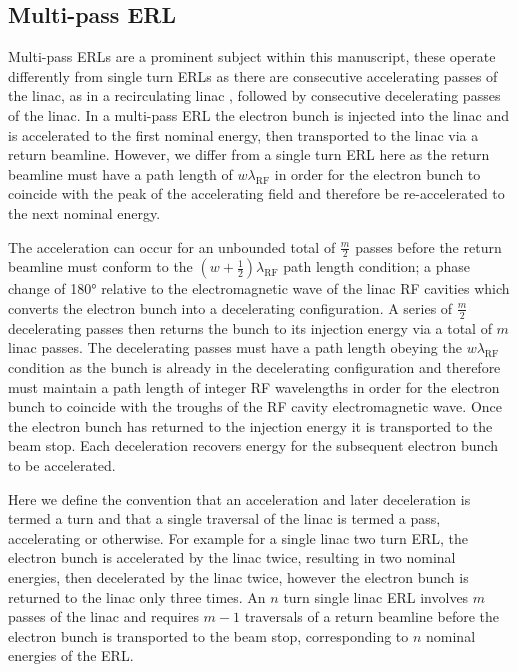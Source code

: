 \documentclass[../main.tex]{subfiles}
\begin{document}
\subsection{Multi-pass ERL}

Multi-pass ERLs are a prominent subject within this manuscript, these operate differently from single turn ERLs as there are consecutive accelerating passes of the linac, as in a recirculating linac \cite{axel1977status}, followed by consecutive decelerating passes of the linac. In a multi-pass ERL the electron bunch is injected into the linac and is accelerated to the first nominal energy, then transported to the linac via a return beamline. However, we differ from a single turn ERL here as the return beamline must have a path length of $w\lambda_{\mathrm{RF}}$ in order for the electron bunch to coincide with the peak of the accelerating field and therefore be re-accelerated to the next nominal energy.

The acceleration can occur for an unbounded total of $\frac{m}{2}$ passes before the return beamline must conform to the $\left(w+\frac{1}{2}\right)\lambda_{\mathrm{RF}}$ path length condition; a phase change of 180\si{\degree} relative to the electromagnetic wave of the linac RF cavities which converts the electron bunch into a decelerating configuration. A series of $\frac{m}{2}$ decelerating passes then returns the bunch to its injection energy via a total of $m$ linac passes. The decelerating passes must have a path length obeying the $w\lambda_{\mathrm{RF}}$ condition as the bunch is already in the decelerating configuration and therefore must maintain a path length of integer RF wavelengths in order for the electron bunch to coincide with the troughs of the RF cavity electromagnetic wave. Once the electron bunch has returned to the injection energy it is transported to the beam stop. Each deceleration recovers energy for the subsequent electron bunch to be accelerated.        

Here we define the convention that an acceleration and later deceleration is termed a turn and that a single traversal of the linac is termed a pass, accelerating or otherwise. For example for a single linac two turn ERL, the electron bunch is accelerated by the linac twice, resulting in two nominal energies, then decelerated by the linac twice, however the electron bunch is returned to the linac only three times. An $n$ turn single linac ERL involves $m$ passes of the linac and requires $m-1$ traversals of a return beamline before the electron bunch is transported to the beam stop, corresponding to $n$ nominal energies of the ERL.   
\end{document}

